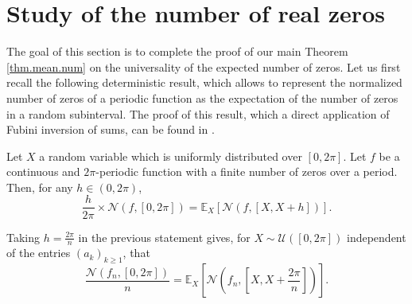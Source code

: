 \documentclass{svproc}
\newcommand \Esp {\mathbb{E}}
\begin{document}


\section{Study of the number of real zeros} \label{sec.study.nb.z}
The goal of this section is to complete the proof of our main Theorem \ref{thm.mean.num} on the universality of the expected number of zeros. 
Let us first recall the following deterministic result, which allows to represent the normalized number of zeros of a periodic function as the expectation of the number of zeros in a random subinterval. The proof of this result, which a direct application of Fubini inversion of sums, can be found in \cite[Lemma 3]{AP21}.
\begin{lemma}
Let $X$ a random variable which is uniformly distributed over $[0,2\pi]$. Let $f$ be a continuous and $2\pi$-periodic function with a finite number of zeros over a period. Then, for any $h \in (0,2\pi)$, 
$$\frac{h}{2\pi} \times \mathcal{N}(f,[0,2\pi]) =\Esp_X\left[\mathcal{N}(f,[X,X+h])\right].$$
\end{lemma}
Taking $h=\frac{2\pi}{n}$ in the previous statement gives, for $X\sim \mathcal{U}([0,2\pi])$ independent of the entries $(a_k)_{k\geq 1}$, that
$$\frac{\mathcal{N}(f_n,[0,2\pi])}{n}=\Esp_X\left[\mathcal{N}\left(f_n,\left[X,X+\frac{2\pi}{n}\right]\right) \right].$$
\end{document}
